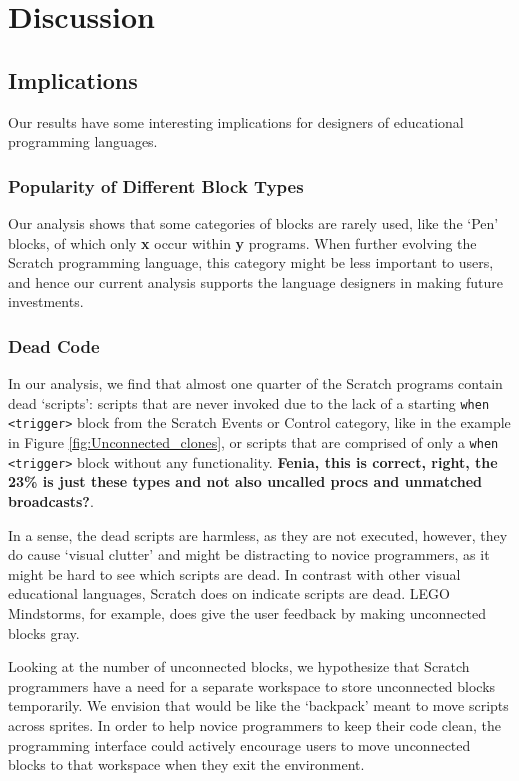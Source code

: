 \documentclass{sig-alternate}
\newcommand{\todo}[1]{\textbf{#1}}
\begin{document}
\section{Discussion}
\label{sec:discussion}
\subsection{Implications}
Our results have some interesting implications for designers of educational programming languages. 



\subsubsection{Popularity of Different Block Types}
Our analysis shows that some categories of blocks are rarely used, like the `Pen' blocks, of which only \todo{x} occur within \todo{y} programs. When further evolving the Scratch programming language, this category might be less important to users, and hence our current analysis supports the language designers in making future investments.

\subsubsection{Dead Code}
In our analysis, we find that almost one quarter of the Scratch programs contain dead `scripts': scripts that are never invoked due to the lack of a starting \texttt{when <trigger>} block from the Scratch Events or Control category, like in the example in Figure \ref{fig:Unconnected_clones}, or scripts that are comprised of only a \texttt{when <trigger>} block without any functionality. \todo{Fenia, this is correct, right, the 23\% is just these types and not also uncalled procs and unmatched broadcasts?}.

In a sense, the dead scripts are harmless, as they are not executed, however, they do cause `visual clutter' and might be distracting to novice programmers, as it might be hard to see which scripts are dead. In contrast with other visual educational languages, Scratch does on indicate scripts are dead. LEGO Mindstorms, for example, does give the user feedback by making unconnected blocks gray. 

Looking at the number of unconnected blocks, we hypothesize that Scratch programmers have a need for a separate workspace to store unconnected blocks temporarily. We envision that would be like the `backpack' meant to move scripts across sprites. In order to help novice programmers to keep their code clean, the programming interface could  actively encourage users to move unconnected blocks to that workspace when they exit the environment.
\end{document}
